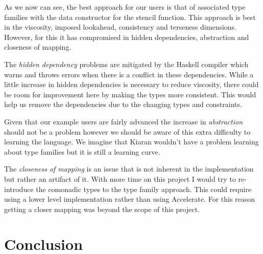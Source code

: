 As we now can see, the best approach for our users is that of associated
type families with the data constructor for the stencil function. This
approach is best in the viscosity, imposed lookahead, consistency and
terseness dimensions. However, for this it has compromised in hidden
dependencies, abstraction and closeness of mapping.

The \emph{hidden dependency} problems are mitigated by the Haskell
compiler which warns and throws errors when there is a conflict in these
dependencies. While a little increase in hidden dependencies is
necessary to reduce viscosity, there could be room for improvement here
by making the types more consistent. This would help us remove the
dependencies due to the changing types and constraints.

Given that our example users are fairly advanced the increase in
\emph{abstraction} should not be a problem however we should be aware of
this extra difficulty to learning the language. We imagine that Kiaran
wouldn't have a problem learning about type families but it is still a
learning curve.

The \emph{closeness of mapping} is an issue that is not inherent in the
implementation but rather an artifact of it. With more time on this
project I would try to re-introduce the comonadic types to the type
family approach. This could require using a lower level implementation
rather than using Accelerate. For this reason getting a closer mapping
was beyond the scope of this project.

\section{Conclusion}
